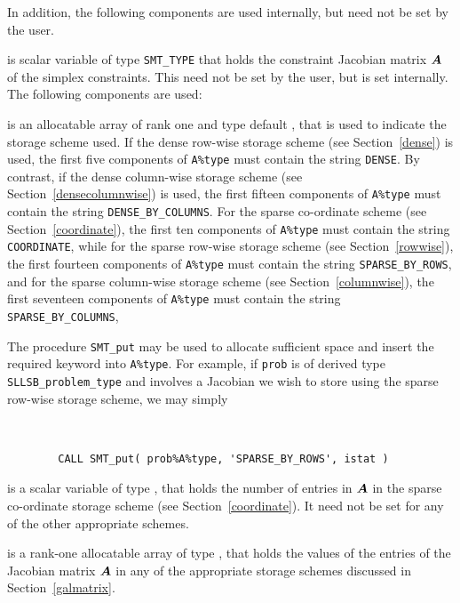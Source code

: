 \documentclass{galahad}
\newcommand{\packagename}{SLLSB}
\begin{document}
In addition, the following components are used internally, but need not be
set by the user.
\begin{description}
 is scalar variable of type {\tt SMT\_TYPE}
that holds the constraint Jacobian matrix ${\bm{A}}$ of the simplex constraints.
This need not be set by the user, but is set internally.
The following components are used:

\begin{description}

 is an allocatable array of rank one and type default \character,
that is used to indicate the storage scheme used.
If the dense row-wise storage scheme (see Section~\ref{dense}) is used,
the first five components of {\tt A\%type} must contain the
string {\tt DENSE}.
By contrast, if the dense column-wise storage scheme
(see Section~\ref{densecolumnwise}) is used,
the first fifteen components of {\tt A\%type} must contain the
string {\tt DENSE\_BY\_COLUMNS}.
For the sparse co-ordinate scheme (see Section~\ref{coordinate}),
the first ten components of {\tt A\%type} must contain the
string {\tt COORDINATE}, while
for the sparse row-wise storage scheme (see Section~\ref{rowwise}),
the first fourteen components of {\tt A\%type} must contain the
string {\tt SPARSE\_BY\_ROWS},
and for the sparse column-wise storage scheme (see Section~\ref{columnwise}),
the first seventeen components of {\tt A\%type} must contain the
string {\tt SPARSE\_BY\_COLUMNS},

The procedure {\tt SMT\_put} may be used to allocate sufficient space and
insert the required keyword into {\tt A\%type}. For example,
if {\tt prob} is of derived type {\tt \packagename\_problem\_type}
and involves a Jacobian we wish to store using the sparse row-wise
storage scheme, we may simply
{\tt
\begin{verbatim}
        CALL SMT_put( prob%A%type, 'SPARSE_BY_ROWS', istat )
\end{verbatim}
}
\noindent

 is a scalar variable of type \integer, that
holds the number of entries in ${\bm{A}}$
in the sparse co-ordinate storage scheme (see Section~\ref{coordinate}).
It need not be set for any of the other appropriate schemes.

 is a rank-one allocatable array of type \realdp, that holds
the values of the entries of the Jacobian matrix ${\bm{A}}$ in any of the
appropriate storage schemes discussed in Section~\ref{galmatrix}.


\end{description}
\end{description}
\end{document}

